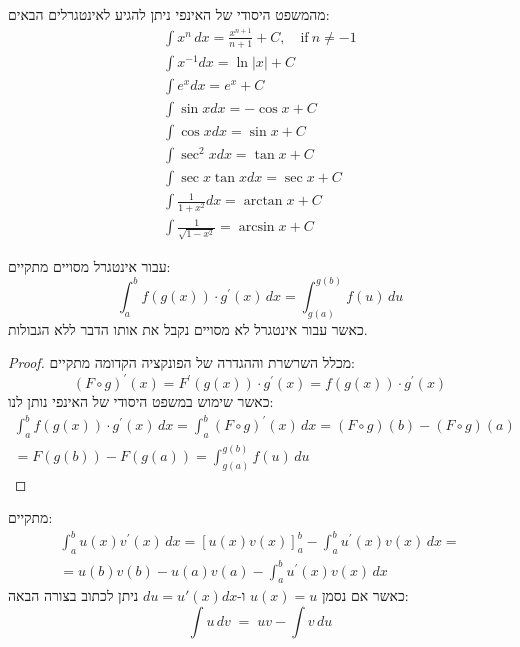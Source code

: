 \documentclass{tstextbook}
\begin{document}
\begin{proposition}
מהמשפט היסודי של האינפי ניתן להגיע לאינטגרלים הבאים:
$$\begin{gather}\int x^{n}\,d x={\frac{x^{n+1}}{n+1}}+C,\quad{\mathrm{if~}}n\neq-1 \\\int{x}^{{-{{1}}}}{\left.{d}{x}\right.}={\ln{{\left|{x}\right|}}}+{C}\\\int{e}^{{{x}}}{\left.{d}{x}\right.}={e}^{{{x}}}+{C}\\\int\sin{{x}}{\left.{d}{x}\right.}=-\cos{{x}}+{C}\\\int\cos{{x}}{\left.{d}{x}\right.}={\sin{{x}}}+{C}\\\int{{\sec}^{{{2}}}{x}}{\left.{d}{x}\right.}={\tan{{x}}}+{C}\\\int{\sec{{x}}}{\tan{{x}}}{\left.{d}{x}\right.}={\sec{{x}}}+{C}\\\int{\frac{{{1}}}{{{1}+{x}^{{{2}}}}}}{\left.{d}{x}\right.}={\arctan{{x}}}+{C}\\\int{\frac{{{1}}}{{\sqrt{{{1}-{x}^{{{2}}}}}}}}=\arcsin x+C
\end{gather}$$

\end{proposition}
\begin{proposition}
עבור אינטגרל מסויים מתקיים:
$$\int_{a}^{b}f(g(x))\cdot g^{\prime}(x)\,d x=\int_{g(a)}^{g(b)}f(u)\,d u$$
כאשר עבור אינטגרל לא מסויים נקבל את אותו הדבר ללא הגבולות.

\end{proposition}
\begin{proof}
מכלל השרשרת וההגדרה של הפונקציה הקדומה מתקיים:
$$(F\circ g)^{\prime}(x)=F^{\prime}(g(x))\cdot g^{\prime}(x)=f(g(x))\cdot g^{\prime}(x)$$
כאשר שימוש במשפט היסודי של האינפי נותן לנו:
$$\begin{gather}{{\int_{a}^{b}f(g(x))\cdot g^{\prime}(x)\,d x=\int_{a}^{b}(F\circ g)^{\prime}(x)\,d x}} {{=(F\circ g)(b)-(F\circ g)(a)}}\\ {{=F(g(b))-F(g(a))}} {{=\int_{g(a)}^{g(b)}f(u)\,d u}}\end{gather}$$

\end{proof}
\begin{proposition}
מתקיים:
$$\begin{gather}\int_{a}^{b}u(x)v^{\prime}(x)\,dx=\left[u(x)v(x)\right]_{a}^{b}-\int_{a}^{b}u^{\prime}(x)v(x)\,dx=\\=u(b)v(b)-u(a)v(a)-\int_{a}^{b}u^{\prime}(x)v(x)\,dx 
\end{gather}$$
כאשר אם נסמן \(u(x)=u\) ו-\(du=u'(x)dx\) ניתן לכתוב בצורה הבאה:
$$\int u\,d v\;=\;u v-\int v\,d u$$

\end{proposition}
\end{document}
